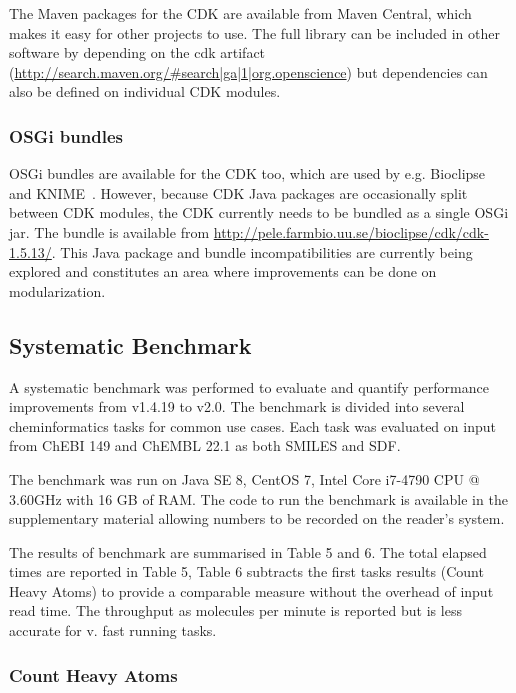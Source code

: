 \documentclass[doublespacing]{bmcart}
\def \cdkversion {v2.0}
\begin{document}
The Maven packages for the CDK are available from Maven Central, which makes it
easy for other projects to use. The full library can be included in other
software by depending on the cdk artifact (\url{http://search.maven.org/#search|ga|1|org.openscience})
but dependencies can also be defined on individual CDK modules.

\subsubsection*{OSGi bundles}

OSGi bundles are available for the CDK too, which are used by e.g.
Bioclipse~\cite{spjuth2007bioclipse,spjuth2009bioclipse} and
KNIME~\cite{Beisken2013}. However, because CDK Java packages are occasionally
split between CDK modules, the CDK currently needs to be bundled as a single
OSGi jar. The bundle is available from \url{http://pele.farmbio.uu.se/bioclipse/cdk/cdk-1.5.13/}.
This Java package and bundle incompatibilities are currently being explored and
constitutes an area where improvements can be done on modularization.

\subsection*{Systematic Benchmark}

A systematic benchmark was performed to evaluate and quantify 
performance improvements from v1.4.19 to \cdkversion{}. The benchmark is 
divided into several cheminformatics tasks for common use cases. Each task 
was evaluated on input from ChEBI 149 \cite{ChEBI13} and ChEMBL 22.1 
\cite{ChEMBL14} as both SMILES and SDF.

The benchmark was run on Java SE 8, CentOS 7, Intel Core i7-4790 CPU @ 
3.60GHz with 16 GB of RAM. The code to run the benchmark is available in 
the supplementary material allowing numbers to be recorded on the
reader's system.

The results of benchmark are summarised in Table 5 and 6. The total elapsed
times are reported in Table 5, Table 6 subtracts the first tasks results 
(Count Heavy Atoms) to provide a comparable measure without the overhead of
input read time. The throughput as molecules per minute is reported but is less
accurate for v. fast running tasks.

\subsubsection*{Count Heavy Atoms}
\end{document}
